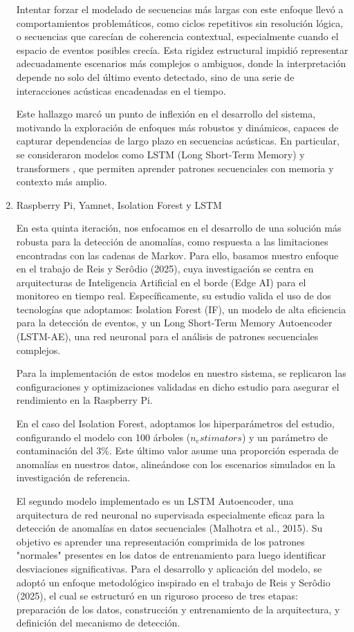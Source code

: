 \begin{enumerate}
            Intentar forzar el modelado de secuencias más largas con este enfoque llevó a comportamientos problemáticos, como ciclos repetitivos sin resolución lógica, o secuencias que carecían de coherencia contextual, especialmente cuando el espacio de eventos posibles crecía. Esta rigidez estructural impidió representar adecuadamente escenarios más complejos o ambiguos, donde la interpretación depende no solo del último evento detectado, sino de una serie de interacciones acústicas encadenadas en el tiempo.

            Este hallazgo marcó un punto de inflexión en el desarrollo del sistema, motivando la exploración de enfoques más robustos y dinámicos, capaces de capturar dependencias de largo plazo en secuencias acústicas. En particular, se consideraron modelos como LSTM (Long Short-Term Memory) y transformers , que permiten aprender patrones secuenciales con memoria y contexto más amplio.

      \item Raspberry Pi, Yamnet, Isolation Forest y LSTM

            En esta quinta iteración, nos enfocamos en el desarrollo de una solución más robusta para la detección de anomalías, como respuesta a las limitaciones encontradas con las cadenas de Markov. Para ello, basamos nuestro enfoque en el trabajo de Reis y Serôdio (2025), cuya investigación se centra en arquitecturas de Inteligencia Artificial en el borde (Edge AI) para el monitoreo en tiempo real. Específicamente, su estudio valida el uso de dos tecnologías que adoptamos: Isolation Forest (IF), un modelo de alta eficiencia para la detección de eventos, y un Long Short-Term Memory Autoencoder (LSTM-AE), una red neuronal para el análisis de patrones secuenciales complejos.

            Para la implementación de estos modelos en nuestro sistema, se replicaron las configuraciones y optimizaciones validadas en dicho estudio para asegurar el rendimiento en la Raspberry Pi.

            En el caso del Isolation Forest, adoptamos los hiperparámetros del estudio, configurando el modelo con 100 árboles ($n_estimators$) y un parámetro de contaminación del 3\%. Este último valor asume una proporción esperada de anomalías en nuestros datos, alineándose con los escenarios simulados en la investigación de referencia.

            El segundo modelo implementado es un LSTM Autoencoder, una arquitectura de red neuronal no supervisada especialmente eficaz para la detección de anomalías en datos secuenciales (Malhotra et al., 2015). Su objetivo es aprender una representación comprimida de los patrones "normales" presentes en los datos de entrenamiento para luego identificar desviaciones significativas.
            Para el desarrollo y aplicación del modelo, se adoptó un enfoque metodológico inspirado en el trabajo de Reis y Serôdio (2025), el cual se estructuró en un riguroso proceso de tres etapas: preparación de los datos, construcción y entrenamiento de la arquitectura, y definición del mecanismo de detección.


\end{enumerate}
